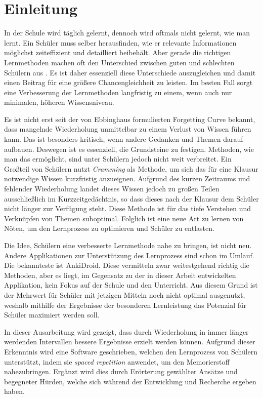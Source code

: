 \setcounter{page}{3}
\chapter{Einleitung}
In der Schule wird täglich gelernt, dennoch wird oftmals nicht gelernt, wie man lernt. Ein Schüler muss selber herausfinden, wie er relevante Informationen möglichst zeiteffizient und detailliert beibehält. Aber gerade die richtigen Lernmethoden machen oft den Unterschied zwischen guten und schlechten Schülern aus \cite{OECD:Lernen}\cite{Hattie:Einflussfaktoren}. Es ist daher essenziell diese Unterschiede auszugleichen und damit einen Beitrag für eine größere Chancengleichheit zu leisten. Im besten Fall sorgt eine Verbesserung der Lernmethoden langfristig zu einem, wenn auch nur minimalen, höheren Wissensniveau.

Es ist nicht erst seit der von Ebbinghaus formulierten Forgetting Curve bekannt, dass mangelnde Wiederholung unmittelbar zu einem Verlust von Wissen führen kann. Das ist besonders kritisch, wenn andere Gedanken und Themen darauf aufbauen. Deswegen ist es essenziell, die Grundsteine zu festigen. Methoden, wie man das ermöglicht, sind unter Schülern jedoch nicht weit verbreitet. Ein Großteil von Schülern nutzt \textit{Cramming} als Methode, um sich das für eine Klausur notwendige Wissen kurzfristig anzueignen. Aufgrund des kurzen Zeitraums und fehlender Wiederholung landet dieses Wissen jedoch zu großen Teilen ausschließlich im Kurzzeitgedächtnis, so dass dieses nach der Klausur dem Schüler nicht länger zur Verfügung steht. Diese Methode ist für das tiefe Verstehen und Verknüpfen von Themen suboptimal. Folglich ist eine neue Art zu lernen von Nöten, um den Lernprozess zu optimieren und Schüler zu entlasten.

Die Idee, Schülern eine verbesserte Lernmethode nahe zu bringen, ist nicht neu. Andere Applikationen zur Unterstützung des Lernprozess sind schon im Umlauf. Die bekannteste ist AnkiDroid. Diese vermitteln zwar weitestgehend richtig die Methoden, aber es liegt, im Gegensatz zu der in dieser Arbeit entwickelten Applikation, kein Fokus auf der Schule und den Unterricht. Aus diesem Grund ist der Mehrwert für Schüler mit jetzigen Mitteln noch nicht optimal ausgenutzt, weshalb mithilfe der Ergebnisse der besonderen Lernleistung das Potenzial für Schüler maximiert werden soll.

In dieser Ausarbeitung wird gezeigt, dass durch Wiederholung in immer länger werdenden Intervallen bessere Ergebnisse erzielt werden können. Aufgrund dieser Erkenntnis wird eine Software geschrieben, welchen den Lernprozess von Schülern unterstützt, indem sie \textit{spaced repetition} anwendet, um den Memorierstoff nahezubringen. Ergänzt wird dies durch Erörterung gewählter Ansätze und begegneter Hürden, welche sich während der Entwicklung und Recherche ergeben haben. \par
